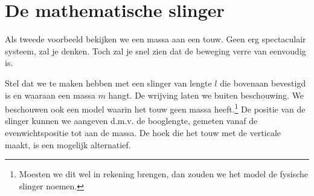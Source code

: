 \documentclass{ximera}
\begin{document}
	\author{Bart Lambregs}





	\section{De mathematische slinger}

	Als tweede voorbeeld bekijken we een massa aan een touw. Geen erg spectaculair systeem, zal je denken. Toch zal je snel zien dat de beweging verre van eenvoudig is.
	
	Stel dat we te maken hebben met een slinger van lengte $l$ die bovenaan bevestigd is en waaraan een massa $m$ hangt. De wrijving laten we buiten beschouwing. We beschouwen ook een model waarin het touw geen massa heeft.\footnote{Moesten we dit wel in rekening brengen, dan zouden we het model de fysische slinger noemen.} De positie van de slinger kunnen we aangeven d.m.v. de booglengte, gemeten vanaf de evenwichtspositie tot aan de massa. De hoek die het touw met de verticale maakt, is een mogelijk alternatief. 
	
\end{document}
